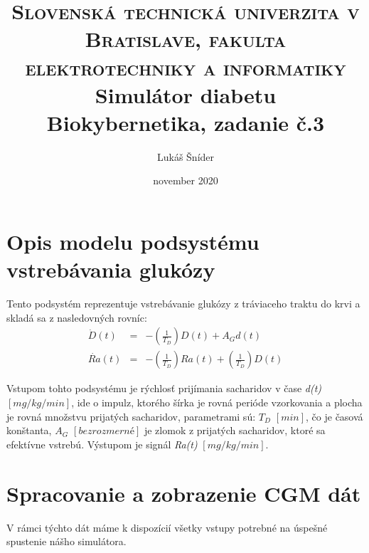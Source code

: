 \documentclass[11pt]{article} %
\title{	
	\normalfont\normalsize
	\textsc{Slovenská technická univerzita v Bratislave, fakulta elektrotechniky a informatiky}\\ %
	\vspace{25pt} %
	\vspace{20pt} %
	\vspace{20pt} %
	\vspace{20pt} %
	\vspace{20pt} %
	\vspace{20pt} %
	\vspace{20pt} %
	\vspace{20pt} %
	\vspace{20pt} %
		\vspace{20pt} %
	\vspace{20pt} %
	\huge Simulátor diabetu\\ %
	\vspace{12pt} %
	\normalsize Biokybernetika, zadanie č.3
	\vspace{20pt} %
	\vspace{20pt} %
	\vspace{20pt} %
		\vspace{20pt} %
	\vspace{20pt} %
		\vspace{20pt} %
	\vspace{20pt} %
		\vspace{20pt} %
	\vspace{20pt} %
	\vspace{20pt} %
	\vspace{20pt} %
		\vspace{20pt} %
	\vspace{20pt} %
	\vspace{12pt} %
}
\author{\LARGE Lukáš Šníder} %
\date{november 2020}
\begin{document}
\maketitle %
\thispagestyle{empty}
\clearpage
\setcounter{page}{1}


\section{Opis modelu podsystému vstrebávania glukózy}
Tento podsystém reprezentuje vstrebávanie glukózy z tráviaceho traktu do krvi a skladá sa z nasledovných rovníc:
\begin{eqnarray}
	\dot{D}(t) &=& -\left(\frac{1}{T_D}\right) D(t) + A_{G}d(t) \label{eq:pvg1} \\ 
	\dot{Ra}(t) &=& -\left(\frac{1}{T_D}\right) Ra(t) + \left(\frac{1}{T_D}\right) D(t) \label{eq:pvg2}
\end{eqnarray}

Vstupom tohto podsystému je rýchlosť prijímania sacharidov v čase \textit{d(t)} $[mg/kg/min]$, ide o impulz, ktorého šírka je rovná perióde vzorkovania a plocha je rovná množstvu prijatých sacharidov, parametrami sú: \textit{$T_D$ $[min]$}, čo je časová konštanta, \textit{$A_G$ $[bezrozmerné]$} je zlomok z prijatých sacharidov, ktoré sa efektívne vstrebú. Výstupom je signál \textit{Ra(t)} \textit{$[mg/kg/min]$}.

\section{Spracovanie a zobrazenie CGM dát}

V rámci týchto dát máme k dispozícií všetky vstupy potrebné na úspešné spustenie nášho simulátora. 
\end{document}
